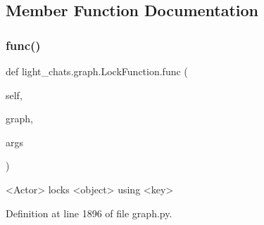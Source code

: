 \subsection{Member Function Documentation}
\mbox{\label{classlight__chats_1_1graph_1_1LockFunction_afdb92aaa380487d44d27381bd168240a}} 
\subsubsection{\texorpdfstring{func()}{func()}}
{\footnotesize\ttfamily def light\+\_\+chats.\+graph.\+Lock\+Function.\+func (\begin{DoxyParamCaption}\item[{}]{self,  }\item[{}]{graph,  }\item[{}]{args }\end{DoxyParamCaption})}

\begin{DoxyVerb}<Actor> locks <object> using <key>
\end{DoxyVerb}
 

Definition at line 1896 of file graph.\+py.


